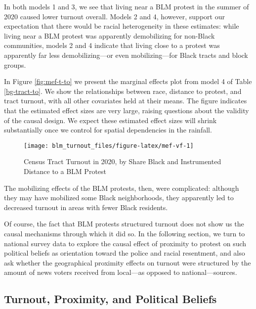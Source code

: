 \documentclass[
  12pt,
]{article}
\begin{document}
In both models 1 and 3, we see that living near a BLM protest in the summer of 2020 caused lower turnout overall. Models 2 and 4, however, support our expectation that there would be racial heterogeneity in these estimates: while living near a BLM protest was apparently demobilizing for non-Black communities, models 2 and 4 indicate that living close to a protest was apparently far less demobilizing---or even mobilizing---for Black tracts and block groups.

\begin{singlespace}

\end{singlespace}

In Figure \ref{fig:mef-t-to} we present the marginal effects plot from model 4 of Table \ref{bg-tract-to}. We show the relationships between race, distance to protest, and tract turnout, with all other covariates held at their means. The figure indicates that the estimated effect sizes are very large, raising questions about the validity of the causal design. We expect these estimated effect sizes will shrink substantially once we control for spatial dependencies in the rainfall.

\begin{figure}[h]

{\centering \texttt{[image: blm\_turnout\_files/figure-latex/mef-vf-1]} 

}

\caption{\label{fig:mef-t-to}Census Tract Turnout in 2020, by Share Black and Instrumented Distance to a BLM Protest}\label{fig:mef-vf}
\end{figure}

The mobilizing effects of the BLM protests, then, were complicated: although they may have mobilized some Black neighborhoods, they apparently led to decreased turnout in areas with fewer Black residents.

Of course, the fact that BLM protests structured turnout does not show us the causal mechanisms through which it did so. In the following section, we turn to national survey data to explore the causal effect of proximity to protest on such political beliefs as orientation toward the police and racial resentment, and also ask whether the geographical proximity effects on turnout were structured by the amount of news voters received from local---as opposed to national---sources.

\hypertarget{turnout-proximity-and-political-beliefs}{%
\subsection*{Turnout, Proximity, and Political Beliefs}\label{turnout-proximity-and-political-beliefs}}
\end{document}
